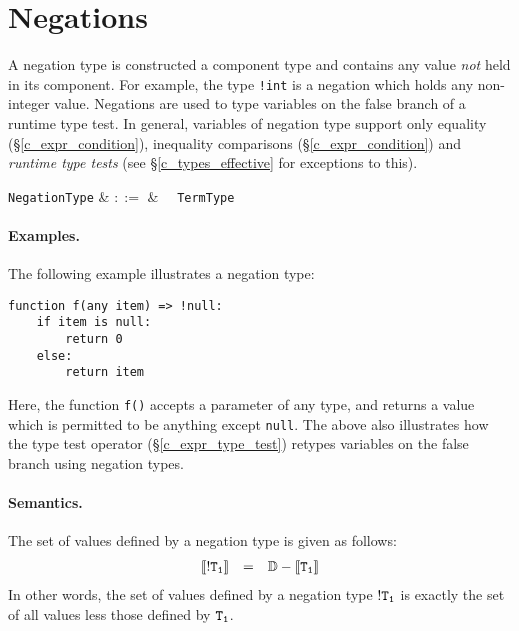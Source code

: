 
\section{Negations}
\label{c_types_negations}

A negation type is constructed a component type and contains any value {\em not} held in its component.  For example, the type \lstinline{!int} is a negation which holds any non-integer value.  Negations are used to type variables on the false branch of a runtime type test.  In general, variables of negation type support only equality (\S\ref{c_expr_condition}), inequality comparisons (\S\ref{c_expr_condition}) and {\em runtime type tests} (see \S\ref{c_types_effective} for exceptions to this).

\begin{syntax}
  \verb+NegationType+ & $::=$ & \token{!}\ \ \verb+TermType+\\
\end{syntax}

\paragraph{Examples.}  The following example illustrates a negation type:

\begin{lstlisting}
function f(any item) => !null:
    if item is null:
        return 0
    else:
        return item
\end{lstlisting}
Here, the function \lstinline{f()} accepts a parameter of any type, and returns a value which is permitted to be anything except \lstinline{null}.  The above also illustrates how the type test operator (\S\ref{c_expr_type_test}) retypes variables on the false branch using negation types.

\paragraph{Semantics.}  The set of values defined by a negation type is given as follows:
\begin{displaymath}
\begin{array}{rcl}
{\tt\llbracket!T_1\rrbracket} & = & {\tt \mathbb{D} - \llbracket T_1\rrbracket}\\
\end{array}
\end{displaymath}
In other words, the set of values defined by a negation type ${\tt !T_1}$ is exactly the set of all values less those defined by ${\tt T_1}$.

